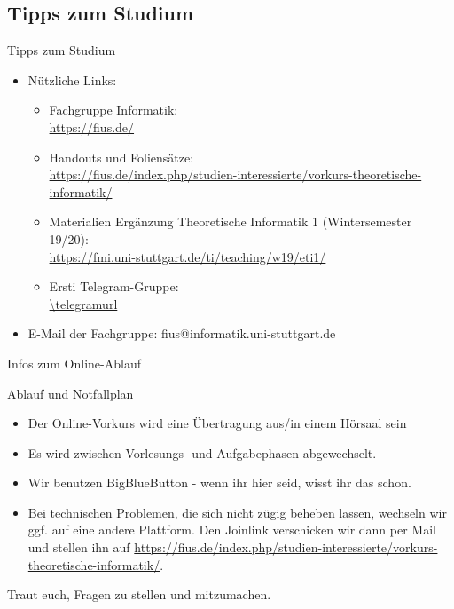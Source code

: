 \subsection{Tipps zum Studium}
\begin{frame}[fragile]{Tipps zum Studium}
  \begin{itemize}
    \item Nützliche Links:\\
          \begin{itemize}
            \item Fachgruppe Informatik:\\
                  \url{https://fius.de/}
            \item Handouts und Foliensätze:\\ \url{https://fius.de/index.php/studien-interessierte/vorkurs-theoretische-informatik/}
            \item Materialien Ergänzung Theoretische Informatik 1 (Wintersemester 19/20): \\
                  \url{https://fmi.uni-stuttgart.de/ti/teaching/w19/eti1/}
            \item Ersti Telegram-Gruppe:\\
                  \qrcode[hyperlink]{\telegramurl}
                  \url{\telegramurl}
          \end{itemize}
    \item E-Mail der Fachgruppe: fius@informatik.uni-stuttgart.de

  \end{itemize}
\end{frame}

\begin{frame}[fragile]{Infos zum Online-Ablauf}
  \begin{alertblock}{Ablauf und Notfallplan}
    \begin{itemize}
      \item Der Online-Vorkurs wird eine Übertragung aus/in einem Hörsaal sein
      \item Es wird zwischen Vorlesungs- und Aufgabephasen abgewechselt.
      \item Wir benutzen BigBlueButton - wenn ihr hier seid, wisst ihr das schon.
      \item Bei technischen Problemen, die sich nicht zügig beheben lassen, wechseln wir ggf. auf eine andere Plattform. Den Joinlink verschicken wir dann per Mail und stellen ihn auf \url{https://fius.de/index.php/studien-interessierte/vorkurs-theoretische-informatik/}.
    \end{itemize}
    \alert{Traut euch, Fragen zu stellen und mitzumachen.}
  \end{alertblock}
\end{frame}

